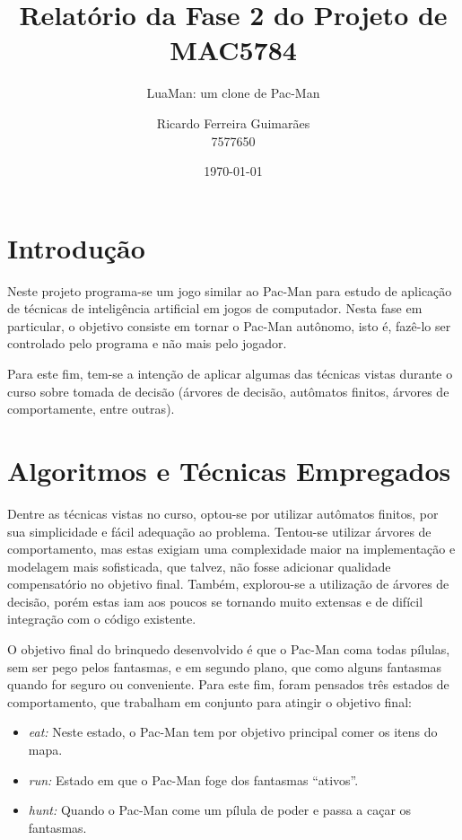 \documentclass[a4paper]{scrartcl}
\title{Relatório da Fase 2 do Projeto de MAC5784}
\subtitle{LuaMan: um clone de Pac-Man}
\author{Ricardo Ferreira Guimarães \\ 7577650}
\date{\today}
\begin{document}
\maketitle

\section{Introdução}

Neste projeto programa-se um jogo similar ao Pac-Man para estudo de aplicação de
técnicas de inteligência artificial em jogos de computador. Nesta fase em particular,
o objetivo consiste em tornar o Pac-Man autônomo, isto é, fazê-lo ser controlado  pelo
programa e não mais pelo jogador.

Para este fim, tem-se a intenção de aplicar algumas das técnicas vistas durante o curso
sobre tomada de decisão (árvores de decisão, autômatos finitos, árvores de comportamente, entre
outras).

\section{Algoritmos e Técnicas Empregados}

Dentre as técnicas vistas no curso, optou-se por utilizar autômatos finitos,
por sua simplicidade e fácil adequação ao problema. Tentou-se utilizar árvores de
comportamento, mas estas exigiam uma complexidade maior na implementação e modelagem mais
sofisticada, que talvez, não fosse adicionar qualidade compensatório no objetivo final.
Também, explorou-se a utilização de árvores de decisão, porém estas iam aos poucos se tornando
muito extensas e de difícil integração com o código existente.

O objetivo final do brinquedo desenvolvido é que o Pac-Man coma todas pílulas, sem ser pego pelos fantasmas, e em segundo plano, que como alguns fantasmas quando for seguro ou conveniente. Para este fim, foram pensados três estados de comportamento, que trabalham em conjunto para atingir o objetivo final:

\begin{itemize}
	\item \textit{eat:} Neste estado, o Pac-Man tem por objetivo principal comer os itens do mapa.
	\item \textit{run:} Estado em que o Pac-Man foge dos fantasmas ``ativos''.
	\item \textit{hunt:} Quando o Pac-Man come um pílula de poder e passa a caçar os fantasmas.
\end{itemize}
\end{document}
